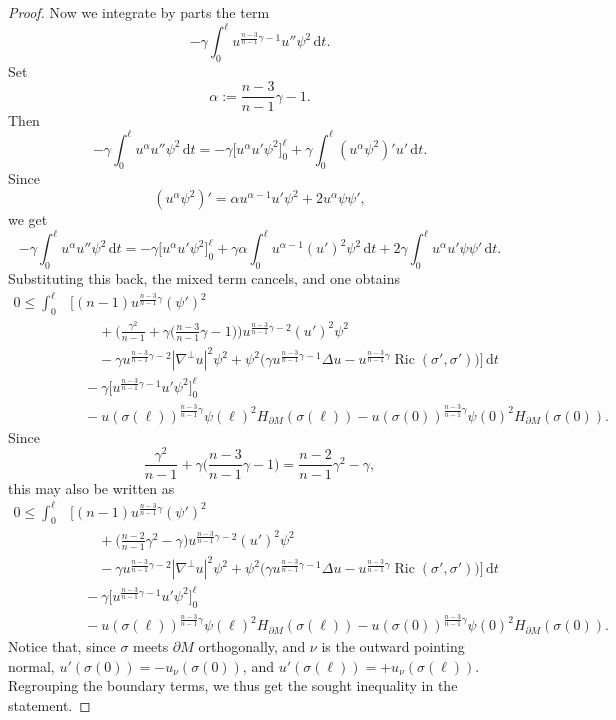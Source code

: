 \documentclass[12pt,a4paper,reqno]{amsart}
\theoremstyle{definition}
\renewcommand{\leq}{\leqslant}
\DeclareMathOperator{\Ric}{Ric}
\begin{document}
{\begin{proof}
Now we integrate by parts the term
\[
-\gamma\int_0^\ell u^{\frac{n-3}{n-1}\gamma-1}u''\psi^2\,\mathrm{d}t.
\]
Set
\[
\alpha:=\frac{n-3}{n-1}\gamma-1.
\]
Then
\[
-\gamma\int_0^\ell u^\alpha u''\psi^2\,\mathrm{d}t
=
-\gamma\Big[u^\alpha u'\psi^2\Big]_0^\ell
+\gamma\int_0^\ell (u^\alpha\psi^2)'u'\,\mathrm{d}t.
\]
Since
\[
(u^\alpha\psi^2)'=\alpha u^{\alpha-1}u'\psi^2+2u^\alpha\psi\psi',
\]
we get
\[
-\gamma\int_0^\ell u^\alpha u''\psi^2\,\mathrm{d}t
=
-\gamma\Big[u^\alpha u'\psi^2\Big]_0^\ell
+\gamma\alpha\int_0^\ell u^{\alpha-1}(u')^2\psi^2\,\mathrm{d}t
+2\gamma\int_0^\ell u^\alpha u'\psi\psi'\,\mathrm{d}t.
\]
Substituting this back, the mixed term cancels, and one obtains
\begin{align*}
0\leq \int_0^\ell &\Big[
(n-1)u^{\frac{n-3}{n-1}\gamma}(\psi')^2 \\
&\qquad
+\Big(\frac{\gamma^2}{n-1}
+\gamma\Big(\frac{n-3}{n-1}\gamma-1\Big)\Big)
u^{\frac{n-3}{n-1}\gamma-2}(u')^2\psi^2 \\
&\qquad
-\gamma u^{\frac{n-3}{n-1}\gamma-2}|\nabla^\perp u|^2\psi^2
+\psi^2\Big(\gamma u^{\frac{n-3}{n-1}\gamma-1}\Delta u
-u^{\frac{n-3}{n-1}\gamma}\Ric(\sigma',\sigma')\Big)
\Big]\,\mathrm{d}t \\
&\quad
-\gamma\Big[u^{\frac{n-3}{n-1}\gamma-1}u'\psi^2\Big]_0^\ell \\
&\quad
-u(\sigma(\ell))^{\frac{n-3}{n-1}\gamma}\psi(\ell)^2H_{\partial M}(\sigma(\ell))
-u(\sigma(0))^{\frac{n-3}{n-1}\gamma}\psi(0)^2H_{\partial M}(\sigma(0)).
\end{align*}
Since
\[
\frac{\gamma^2}{n-1}
+\gamma\Big(\frac{n-3}{n-1}\gamma-1\Big)
=
\frac{n-2}{n-1}\gamma^2-\gamma,
\]
this may also be written as
\begin{align*}
0\leq \int_0^\ell &\Big[
(n-1)u^{\frac{n-3}{n-1}\gamma}(\psi')^2 \\
&\qquad
+\Big(\frac{n-2}{n-1}\gamma^2-\gamma\Big)
u^{\frac{n-3}{n-1}\gamma-2}(u')^2\psi^2 \\
&\qquad
-\gamma u^{\frac{n-3}{n-1}\gamma-2}|\nabla^\perp u|^2\psi^2
+\psi^2\Big(\gamma u^{\frac{n-3}{n-1}\gamma-1}\Delta u
-u^{\frac{n-3}{n-1}\gamma}\Ric(\sigma',\sigma')\Big)
\Big]\,\mathrm{d}t \\
&\quad
-\gamma\Big[u^{\frac{n-3}{n-1}\gamma-1}u'\psi^2\Big]_0^\ell \\
&\quad
-u(\sigma(\ell))^{\frac{n-3}{n-1}\gamma}\psi(\ell)^2H_{\partial M}(\sigma(\ell))
-u(\sigma(0))^{\frac{n-3}{n-1}\gamma}\psi(0)^2H_{\partial M}(\sigma(0)).
\end{align*}
Notice that, since $\sigma$ meets $\partial M$ orthogonally, and $\nu$ is the outward pointing normal, $u'(\sigma(0))=-u_\nu(\sigma(0))$, and $u'(\sigma(\ell))=+u_\nu(\sigma(\ell))$. Regrouping the boundary terms, we thus get the sought inequality in the statement.

\end{proof}}
\end{document}
